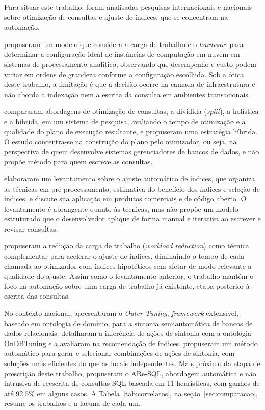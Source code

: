 Para situar este trabalho, foram analisadas pesquisas internacionais e nacionais sobre otimização de consultas e ajuste de índices, que se concentram na automação.

 propuseram um modelo que considera a carga de trabalho e o \textit{hardware} para determinar a configuração ideal de instâncias de computação em nuvem em sistemas de processamento analítico, observando que desempenho e custo podem variar em ordens de grandeza conforme a configuração escolhida. Sob a ótica deste trabalho, a limitação é que a decisão ocorre na camada de infraestrutura e não aborda a indexação nem a escrita da consulta em ambientes transacionais.

 compararam abordagens de otimização de consultas, a dividida (\textit{split}), a holística e a híbrida, em um sistema de pesquisa, avaliando o tempo de otimização e a qualidade do plano de execução resultante, e propuseram uma estratégia híbrida. O estudo concentra-se na construção do plano pelo otimizador, ou seja, na perspectiva de quem desenvolve sistemas gerenciadores de bancos de dados, e não propõe método para quem escreve as consultas.

 elaboraram um levantamento sobre o ajuste automático de índices, que organiza as técnicas em pré-processamento, estimativa do benefício dos índices e seleção de índices, e discute sua aplicação em produtos comerciais e de código aberto. O levantamento é abrangente quanto às técnicas, mas não propõe um modelo estruturado que o desenvolvedor aplique de forma manual e iterativa ao escrever e revisar consultas.

 propuseram a redução da carga de trabalho (\textit{workload reduction}) como técnica complementar para acelerar o ajuste de índices, diminuindo o tempo de cada chamada ao otimizador com índices hipotéticos sem afetar de modo relevante a qualidade do ajuste. Assim como o levantamento anterior, o trabalho mantém o foco na automação sobre uma carga de trabalho já existente, etapa posterior à escrita das consultas. 

No contexto nacional,  apresentaram o \textit{Outer-Tuning}, \textit{framework} extensível, baseado em ontologia de domínio, para a sintonia semiautomática de bancos de dados relacionais.  detalharam a inferência de ações de sintonia com a ontologia OnDBTuning e a avaliaram na recomendação de índices.  propuseram um método automático para gerar e selecionar combinações de ações de sintonia, com soluções mais eficientes do que as locais independentes. Mais próximo da etapa de prescrição deste trabalho,  propuseram o ARe-SQL, abordagem automática e não intrusiva de reescrita de consultas SQL baseada em 11 heurísticas, com ganhos de até 92,5\% em alguns casos. A Tabela~\ref{tab:correlatos}, na seção~\ref{sec:comparacao}, resume os trabalhos e a lacuna de cada um.

